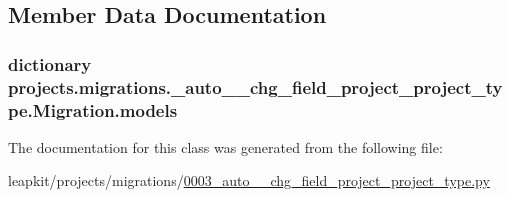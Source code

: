 \subsection{Member Data Documentation}
\hypertarget{classprojects_1_1migrations_1_10003__auto____chg__field__project__project__type_1_1_migration_a8c9f040a0cdcfd721e5fd5d43bb759a1}{
\subsubsection[{models}]{\setlength{\rightskip}{0pt plus 5cm}dictionary projects.\-migrations.\-\_\-auto\-\_\-\-\_\-chg\-\_\-field\-\_\-project\-\_\-project\-\_\-type.\-Migration.\-models\hspace{0.3cm}{\ttfamily [static]}}}\label{classprojects_1_1migrations_1_10003__auto____chg__field__project__project__type_1_1_migration_a8c9f040a0cdcfd721e5fd5d43bb759a1}


The documentation for this class was generated from the following file\-:\begin{DoxyCompactItemize}
\item 
leapkit/projects/migrations/\hyperlink{0003__auto____chg__field__project__project__type_8py}{0003\-\_\-auto\-\_\-\-\_\-chg\-\_\-field\-\_\-project\-\_\-project\-\_\-type.\-py}\end{DoxyCompactItemize}
